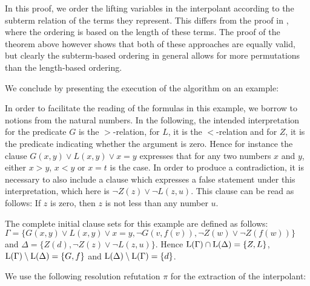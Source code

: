 \begin{remark}
	In this proof, we order the lifting variables in the interpolant according to the subterm relation of the terms they represent.
	This differs from the proof in \cite{Huang95}, where the ordering is based on the length of these terms.
	The proof of the theorem above however shows that both of these approaches are equally valid, but clearly the subterm-based ordering in general allows for more permutations than the length-based ordering. 
\end{remark}

We conclude by presenting the execution of the algorithm on an example:

\begin{exa}
	\label{exa:two_phase}
	In order to facilitate the reading of the formulas in this example, we borrow to notions from the natural numbers.
	In the following, 
	the intended interpretation for the predicate $G$ is the $>$-relation, for $L$, it is the $<$-relation and for $Z$, it is the predicate indicating whether the argument is zero.
	Hence for instance the clause $G(x, y) \lor L(x, y) \lor x = y$ expresses that for any two numbers $x$ and $y$, either $x>y$, $x<y$ or $x=t$ is the case.
	In order to produce a contradiction, it is necessary to also include a clause which expresses a false statement under this interpretation, which here is $\lnot Z(z) \lor \lnot L(z, u)$. 
	This clause can be read as follows: If $z$ is zero, then $z$ is not less than any number $u$.

	The complete initial clause sets for this example are defined as follows:
	$\Gamma = \{ G(x, y) \lor L(x, y) \lor x = y, \lnot G(v, f(v)), \lnot Z(w) \lor \lnot Z(f(w)) \}$
	and 
	$\Delta = \{ Z(d), \lnot Z(z) \lor \lnot L(z, u) \}$.
	Hence $\operatorname{L}(\Gamma)\cap \operatorname{L}(\Delta) = \{ Z, L \}$,
	$\operatorname{L}(\Gamma)\setminus \operatorname{L}(\Delta) = \{ G,  f \}$ and
	$\operatorname{L}(\Delta)\setminus \operatorname{L}(\Gamma) = \{ d \}$.

	We use the following resolution refutation $\pi$ for the extraction of the interpolant:
	\smallskip
	{ %

		


		\begin{adjustwidth}{7em}{0em}
			\def\defaultHypSeparation{\hskip 1.4em}
			\def\ScoreOverhang{-0em}
			\begin{prooftree}



\end{prooftree}
\end{adjustwidth}}
\end{exa}
